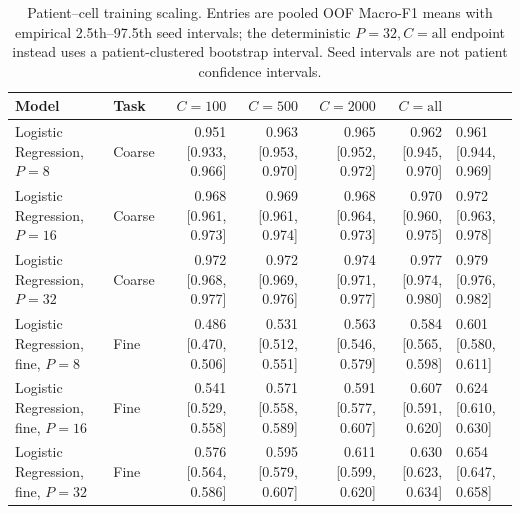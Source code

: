 \begin{table}[t]
\centering
\small
\begin{tabular}{llrrrr}
\toprule
Model & Task & $C=100$ & $C=500$ & $C=2000$ & $C=\mathrm{all}$ \\
\midrule
Logistic Regression, $P=8$ & Coarse & 0.951 [0.933, 0.966] & 0.963 [0.953, 0.970] & 0.965 [0.952, 0.972] & 0.962 [0.945, 0.970] & 0.961 [0.944, 0.969] \\
Logistic Regression, $P=16$ & Coarse & 0.968 [0.961, 0.973] & 0.969 [0.961, 0.974] & 0.968 [0.964, 0.973] & 0.970 [0.960, 0.975] & 0.972 [0.963, 0.978] \\
Logistic Regression, $P=32$ & Coarse & 0.972 [0.968, 0.977] & 0.972 [0.969, 0.976] & 0.974 [0.971, 0.977] & 0.977 [0.974, 0.980] & 0.979 [0.976, 0.982] \\
Logistic Regression, fine, $P=8$ & Fine & 0.486 [0.470, 0.506] & 0.531 [0.512, 0.551] & 0.563 [0.546, 0.579] & 0.584 [0.565, 0.598] & 0.601 [0.580, 0.611] \\
Logistic Regression, fine, $P=16$ & Fine & 0.541 [0.529, 0.558] & 0.571 [0.558, 0.589] & 0.591 [0.577, 0.607] & 0.607 [0.591, 0.620] & 0.624 [0.610, 0.630] \\
Logistic Regression, fine, $P=32$ & Fine & 0.576 [0.564, 0.586] & 0.595 [0.579, 0.607] & 0.611 [0.599, 0.620] & 0.630 [0.623, 0.634] & 0.654 [0.647, 0.658] \\
\midrule
\bottomrule
\end{tabular}
\caption{Patient--cell training scaling. Entries are pooled OOF Macro-F1 means with empirical 2.5th--97.5th seed intervals; the deterministic $P=32,C=\mathrm{all}$ endpoint instead uses a patient-clustered bootstrap interval. Seed intervals are not patient confidence intervals.}
\label{tab:patient_cell_scaling}
\end{table}

